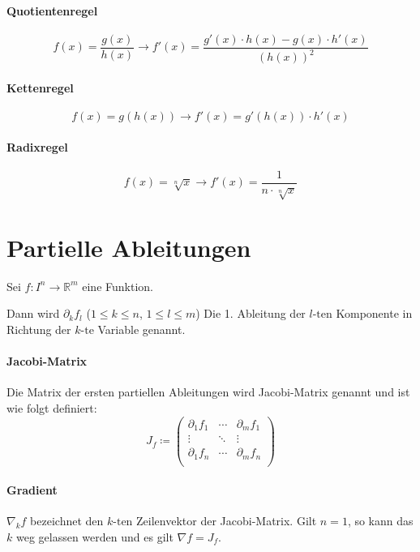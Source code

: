 			\paragraph{Quotientenregel}
				\[ f(x) = \frac{g(x)}{h(x)} \rightarrow f'(x) = \frac{g'(x) \cdot h(x) - g(x) \cdot h'(x)}{(h(x)) ^ 2} \]

			\paragraph{Kettenregel}
				\[ f(x) = g(h(x)) \rightarrow f'(x) = g'(h(x)) \cdot h'(x) \]

			\paragraph{Radixregel}
				\[ f(x) = \sqrt[n]{x} \rightarrow f'(x) = \frac{1}{n \cdot \sqrt[n]{x}} \]

	\section{Partielle Ableitungen}
		Sei $ f : I ^ n \rightarrow \mathbb{R} ^ m $ eine Funktion.

		Dann wird $ \partial _ k f _ l $ ($ 1 \leq k \leq n $, $ 1 \leq l \leq m $) Die 1. Ableitung der $ l\text{-ten} $ Komponente in Richtung der $ k\text{-te} $ Variable genannt.

	\paragraph{Jacobi-Matrix}
		Die Matrix der ersten partiellen Ableitungen wird Jacobi-Matrix genannt und ist wie folgt definiert:
		\begin{equation*}
			J _ f \coloneqq
			\begin{pmatrix}
				\partial _ 1 f _ 1 & \cdots & \partial _ m f _ 1 \\
				\vdots             & \ddots & \vdots             \\
				\partial _ 1 f _ n & \cdots & \partial _ m f _ n \\
			\end{pmatrix}
		\end{equation*}

	\paragraph{Gradient}
		$ \nabla _ k f $ bezeichnet den $ k\text{-ten} $ Zeilenvektor der Jacobi-Matrix. Gilt $ n = 1 $, so kann das $ k $ weg gelassen werden und es gilt $ \nabla f = J _ f $.

